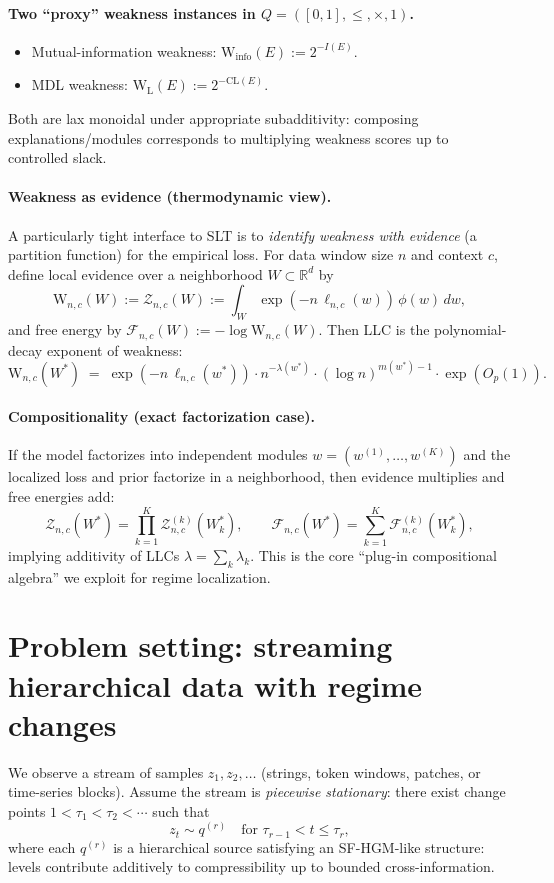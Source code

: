 \documentclass[11pt]{article}
\newcommand{\R}{\mathbb{R}}
\newcommand{\code}{\mathrm{CL}}  %
\newcommand{\weak}{\mathrm{W}}  %
\newcommand{\Zev}{\mathcal{Z}}  %
\newcommand{\Ffree}{\mathcal{F}}%
\begin{document}
\paragraph{Two ``proxy'' weakness instances in $Q=([0,1],\le,\times,1)$.}
\begin{itemize}
  \item Mutual-information weakness: $\weak_{\mathrm{info}}(E) := 2^{-I(E)}$.
  \item MDL weakness: $\weak_{\mathrm{L}}(E) := 2^{-\code(E)}$.
\end{itemize}
Both are lax monoidal under appropriate subadditivity: composing explanations/modules corresponds to
multiplying weakness scores up to controlled slack.

\paragraph{Weakness as evidence (thermodynamic view).}
A particularly tight interface to SLT is to \emph{identify weakness with evidence} (a partition function)
for the empirical loss. For data window size $n$ and context $c$, define local evidence over a neighborhood
$W \subset \R^d$ by
\[
\weak_{n,c}(W) := \Zev_{n,c}(W) := \int_W \exp(-n\, \ell_{n,c}(w)) \, \phi(w)\, dw,
\]
and free energy by $\Ffree_{n,c}(W) := -\log \weak_{n,c}(W)$.
Then LLC is the polynomial-decay exponent of weakness:
\[
\weak_{n,c}(W^\ast) \;=\; \exp(-n\,\ell_{n,c}(w^\ast))\cdot n^{-\lambda(w^\ast)}\cdot (\log n)^{m(w^\ast)-1}\cdot \exp(O_p(1)).
\]

\paragraph{Compositionality (exact factorization case).}
If the model factorizes into independent modules $w=(w^{(1)},\dots,w^{(K)})$ and the localized loss and prior
factorize in a neighborhood, then evidence multiplies and free energies add:
\[
\Zev_{n,c}(W^\ast) = \prod_{k=1}^K \Zev^{(k)}_{n,c}(W_k^\ast),
\qquad
\Ffree_{n,c}(W^\ast) = \sum_{k=1}^K \Ffree^{(k)}_{n,c}(W_k^\ast),
\]
implying additivity of LLCs $\lambda = \sum_k \lambda_k$.
This is the core ``plug-in compositional algebra'' we exploit for regime localization.

\section{Problem setting: streaming hierarchical data with regime changes}
We observe a stream of samples $z_1,z_2,\dots$ (strings, token windows, patches, or time-series blocks).
Assume the stream is \emph{piecewise stationary}:
there exist change points $1 < \tau_1 < \tau_2 < \cdots$ such that
\[
z_t \sim q^{(r)} \quad \text{for } \tau_{r-1} < t \le \tau_r,
\]
where each $q^{(r)}$ is a hierarchical source satisfying an SF-HGM-like structure: levels contribute
additively to compressibility up to bounded cross-information.
\end{document}

